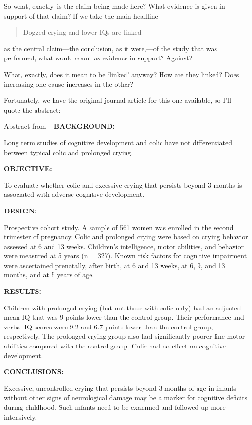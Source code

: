 \begin{refsection}
So what, exactly, is the claim being made here? What evidence is given in support of that claim? If we take the main headline

\begin{quote}

Dogged crying and lower IQs are linked
\end{quote}

as the central claim---the conclusion, as it were,---of the study that was performed, what would count as evidence in support? Against? 

What, exactly, does it mean to be `linked' anyway? How are they linked? Does increasing one cause increases in the other?

Fortunately, we have the original journal article for this one available, so I’ll quote the abstract:
\begin{apatextbox}{Abstract from  ~\citep{Rao:2004ku} }
\textbf{BACKGROUND:}

Long term studies of cognitive development and colic have not differentiated between typical colic and prolonged crying.

\textbf{OBJECTIVE:}

To evaluate whether colic and excessive crying that persists beyond 3 months is associated with adverse cognitive development.

\textbf{DESIGN:}

Prospective cohort study. A sample of 561 women was enrolled in the second trimester of pregnancy. Colic and prolonged crying were based on crying behavior assessed at 6 and 13 weeks. Children's intelligence, motor abilities, and behavior were measured at 5 years (n = 327). Known risk factors for cognitive impairment were ascertained prenatally, after birth, at 6 and 13 weeks, at 6, 9, and 13 months, and at 5 years of age.

\textbf{RESULTS:}

Children with prolonged crying (but not those with colic only) had an adjusted mean IQ that was 9 points lower than the control group. Their performance and verbal IQ scores were 9.2 and 6.7 points lower than the control group, respectively. The prolonged crying group also had significantly poorer fine motor abilities compared with the control group. Colic had no effect on cognitive development.

\textbf{CONCLUSIONS:}

Excessive, uncontrolled crying that persists beyond 3 months of age in infants without other signs of neurological damage may be a marker for cognitive deficits during childhood. Such infants need to be examined and followed up more intensively.
\end{apatextbox}


\end{refsection}
